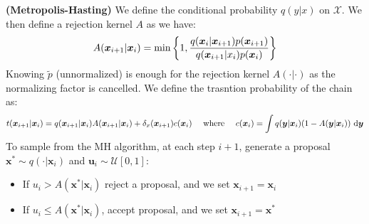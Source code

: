 \begin{definition}{\textbf{(Metropolis-Hasting)}}
    We define the conditional probability $q(y|x)$ on $\mathcal{X}$. We then define a rejection kernel $A$ as we have:
    \begin{equation*}
        A(\boldsymbol x_{i+1}|\boldsymbol x_i) = \min\left\{ 1, \frac{q(\boldsymbol x_i | \boldsymbol x_{i+1})p(\boldsymbol x_{i+1})}{q(\boldsymbol x_{i+1}|x_i)p(\boldsymbol x_i)} \right\}
    \end{equation*}
    Knowing $\tilde{p}$ (unnormalized) is enough for the rejection kernel $A(\cdot|\cdot)$ as the normalizing factor is cancelled. We define the trasntion probability of the chain as:
    \begin{equation*}
        t(\boldsymbol x_{i+1} | \boldsymbol x_i) = q(\boldsymbol x_{i+1} | \boldsymbol x_i)A(\boldsymbol x_{i+1}|\boldsymbol x_i) + \delta_x(\boldsymbol x_{i+1})c(\boldsymbol x_i) \quad \text{ where } \quad c(\boldsymbol x_i) = \int q(\boldsymbol y|\boldsymbol x_i)(1 - A(\boldsymbol y|\boldsymbol x_i))\ \mathrm{d} \boldsymbol y
    \end{equation*}
    To sample from the MH algorithm, at each step $i+1$, generate a proposal $\boldsymbol x^* \sim q(\cdot|\boldsymbol x_i)$ and $\boldsymbol u_i\sim\mathcal{U}[0, 1]$:
    \begin{itemize}
        \item If $u_i>A(\boldsymbol x^* | \boldsymbol x_i)$ reject a proposal, and we set $\boldsymbol x_{i+1}=\boldsymbol x_i$ 
        \item If $u_i \le A(\boldsymbol x^* | \boldsymbol x_i)$, accept proposal, and we set $\boldsymbol x_{i+1}=\boldsymbol x^*$
    \end{itemize}  
\end{definition}

